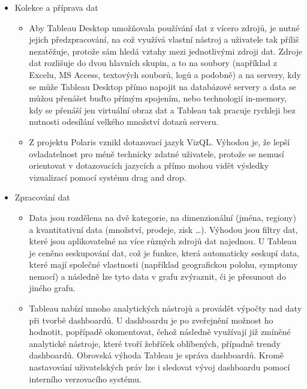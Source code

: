\documentclass[czech,BP]{thesiskiv2}
\begin{document}
 \begin{itemize}
 	\item Kolekce a příprava dat
 	\begin{itemize}
		\item Aby Tableau Desktop umožňovala používání dat z vícero zdrojů, je nutné jejich předzpracování, na což využívá vlastní nástroj a uživatele tak příliš nezatěžuje, protože sám hledá vztahy mezi jednotlivými zdroji dat. Zdroje dat rozlišuje do dvou hlavních skupin, a to na soubory (například z Excelu, MS Access, textových souborů, logů a podobně) a na servery, kdy se může Tableau Desktop přímo napojit na databázové servery a data se můžou přenášet buďto přímým spojením, nebo technologií in-memory, kdy se přenáší jen virtuální obraz dat a Tableau tak pracuje rychleji bez nutnosti odesílání velkého množství dotazů serveru.
		
		\item Z projektu Polaris vznikl dotazovací jazyk VizQL\texttrademark. \cite{VizQL} Výhodou je, že lepší ovladatelnost pro méně technicky zdatné uživatele, protože se nemusí orientovat v dotazovacích jazycích a přímo mohou vidět výsledky vizualizací pomocí systému drag and drop.
 	\end{itemize}
 	\item Zpracování dat
 	\begin{itemize}
		\item Data jsou rozdělena na dvě kategorie, na dimenzionální (jména, regiony) a kvantitativní data (množství, prodeje, zisk …). Výhodou jsou filtry dat, které jsou aplikovatelné na více různých zdrojů dat najednou. U Tableau je ceněno seskupování dat, což je funkce, která automaticky seskupí data, které mají společné vlastnosti (například geografickou polohu, symptomy nemocí) a následně lze tyto data v grafu zvýraznit, či je přesunout do jiného grafu.\cite{TableauDimensions}
		
		\item Tableau nabízí mnoho analytických nástrojů a provádět výpočty nad daty při tvorbě dashboardů. U dashboardu je po zveřejnění možnost ho hodnotit, popřípadě okomentovat, čehož následně využívají již zmíněné analytické nástroje, které tvoří žebříček oblíbených, případně trendy dashboardů. Obrovská výhoda Tableau je správa dashboardů. Kromě nastavování uživatelských práv lze i sledovat vývoj dashboardu pomocí interního verzovacího systému.\cite{TableauVersion} 
		
 	\end{itemize}
 \end{itemize}
 
\end{document}

